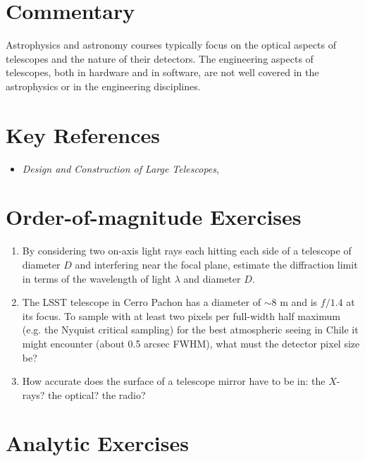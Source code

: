 \section{Commentary}

Astrophysics and astronomy courses typically focus on the optical
aspects of telescopes and the nature of their detectors.  The
engineering aspects of telescopes, both in hardware and in software,
are not well covered in the astrophysics or in the engineering
disciplines.

\section{Key References}

\begin{itemize}
  \item
    {\it Design and Construction of Large Telescopes},
      \citet{bely}
\end{itemize}

\citet{gunn06a}

\section{Order-of-magnitude Exercises}

\begin{enumerate} 
\item By considering two on-axis light rays each hitting each side of a
    telescope of diameter $D$ and interfering near the focal plane,
    estimate the diffraction limit in terms of the wavelength of light
    $\lambda$ and diameter $D$.

\item The LSST telescope in Cerro Pachon has a diameter of $\sim 8$ m
    and is $f/1.4$ at its focus. To sample with at least two pixels
    per full-width half maximum (e.g. the Nyquist critical sampling)
    for the best atmospheric seeing in Chile it might encounter (about
    0.5 arcsec FWHM), what must the detector pixel size be?

\item How accurate does the surface of a telescope mirror have to be
    in: the $X$-rays? the optical? the radio?
\end{enumerate} 

\section{Analytic Exercises}

